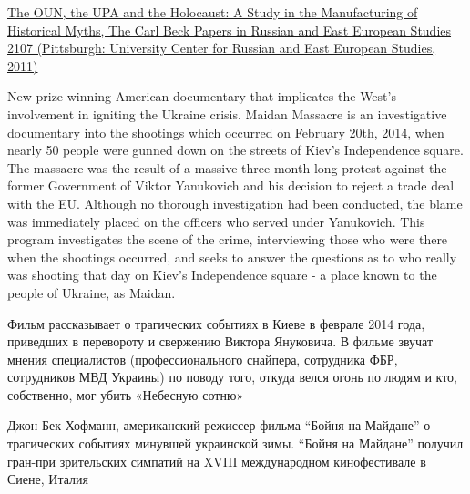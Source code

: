 \begin{itemize}
\href{https://www.academia.edu/1122859/The_OUN_the_UPA_and_the_Holocaust_A_Study_in_the_Manufacturing_of_Historical_Myths_The_Carl_Beck_Papers_in_Russian_and_East_European_Studies_2107_Pittsburgh_University_Center_for_Russian_and_East_European_Studies_2011_}{%
The OUN, the UPA and the Holocaust: A Study in the Manufacturing of Historical Myths, The Carl Beck Papers in Russian and East European Studies 2107 (Pittsburgh: University Center for Russian and East European Studies, 2011)
}


New prize winning American documentary that implicates the West's involvement
in igniting the Ukraine crisis. Maidan Massacre is an investigative documentary
into the shootings which occurred on February 20th, 2014, when nearly 50 people
were gunned down on the streets of Kiev's Independence square.  The massacre
was the result of a massive three month long protest against the former
Government of Viktor Yanukovich and his decision to reject a trade deal with
the EU. Although no thorough investigation had been conducted, the blame was
immediately placed on the officers who served under Yanukovich. This program
investigates the scene of the crime, interviewing those who were there when the
shootings occurred, and seeks to answer the questions as to who really was
shooting that day on Kiev's Independence square - a place known to the people
of Ukraine, as Maidan.

Фильм рассказывает о трагических событиях в Киеве в феврале 2014 года,
приведших в перевороту и свержению Виктора Януковича. В фильме звучат мнения
специалистов (профессионального снайпера, сотрудника ФБР, сотрудников МВД
Украины) по поводу того, откуда велся огонь по людям и кто, собственно, мог
убить «Небесную сотню»

Джон Бек Хофманн, американский режиссер фильма \enquote{Бойня на Майдане} о
трагических событиях минувшей украинской зимы. \enquote{Бойня на Майдане}
получил гран-при зрительских симпатий на XVIII международном кинофестивале в
Сиене, Италия

\end{itemize} %
